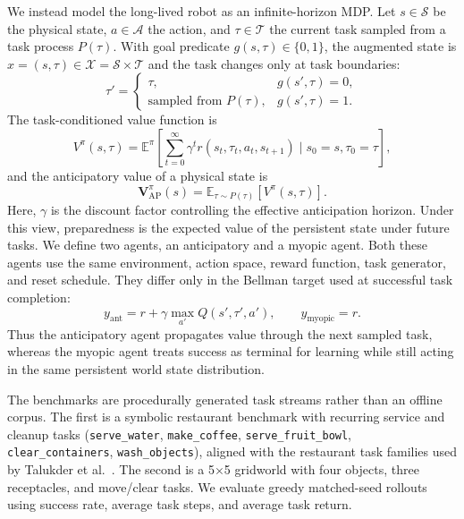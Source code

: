 \documentclass{article}
\begin{document}
We instead model the long-lived robot as an infinite-horizon MDP. Let $s \in \mathcal{S}$ be the physical state, $a \in \mathcal{A}$ the action, and $\tau \in \mathcal{T}$ the current task sampled from a task process $P(\tau)$. With goal predicate $g(s,\tau)\in\{0,1\}$, the augmented state is $x=(s,\tau)\in\mathcal{X}=\mathcal{S}\times\mathcal{T}$ and the task changes only at task boundaries:
\begin{equation}
\label{eq:task-transition}
\tau'=
\begin{cases}
\tau, & g(s',\tau)=0,\\
\text{sampled from } P(\tau), & g(s',\tau)=1.
\end{cases}
\end{equation}
The task-conditioned value function is
\begin{equation}
\label{eq:value}
V^\pi(s,\tau)=\mathbb{E}^\pi\!\left[\sum_{t=0}^{\infty}\gamma^t r(s_t,\tau_t,a_t,s_{t+1}) \mid s_0=s,\tau_0=\tau\right],
\end{equation}
and the anticipatory value of a physical state is
\begin{equation}
\label{eq:ap-value}
\mathbf{V}_{\mathrm{AP}}^\pi(s)=\mathbb{E}_{\tau \sim P(\tau)}[V^\pi(s,\tau)].
\end{equation}
Here, $\gamma$ is the discount factor controlling the effective anticipation horizon. Under this view, preparedness is the expected value of the persistent state under future tasks.
We define two agents, an anticipatory and a myopic agent. Both these agents use the same environment, action space, reward function, task generator, and reset schedule. They differ only in the Bellman target used at successful task completion:
\begin{equation}
\label{eq:targets}
y_{\text{ant}}=r+\gamma \max_{a'}Q(s',\tau',a'),
\qquad
y_{\text{myopic}}=r.
\end{equation}
Thus the anticipatory agent propagates value through the next sampled task, whereas the myopic agent treats success as terminal for learning while still acting in the same persistent world state distribution.

The benchmarks are procedurally generated task streams rather than an offline corpus. The first is a symbolic restaurant benchmark with recurring service and cleanup tasks (\texttt{serve\_water}, \texttt{make\_coffee}, \texttt{serve\_fruit\_bowl}, \texttt{clear\_containers}, \texttt{wash\_objects}), aligned with the restaurant task families used by Talukder et al.\ \cite{talukder2024large}. The second is a 5$\times$5 gridworld with four objects, three receptacles, and move/clear tasks. We evaluate greedy matched-seed rollouts using success rate, average task steps, and average task return.
\end{document}
